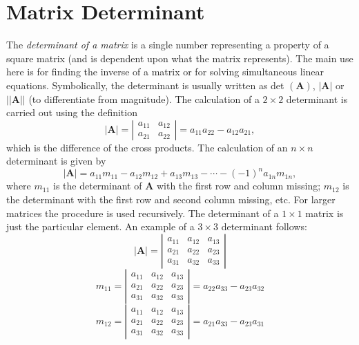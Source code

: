\section{Matrix Determinant}
The \emph{determinant of a matrix} is a single number representing a property of a square matrix 
(and is dependent upon what the matrix represents). The main use here is for finding the inverse of a 
matrix or for solving simultaneous linear equations. Symbolically, the determinant is usually written as
det $(\mathbf{A})$, $\mathbf{|A|}$ or $\mathbf{||A||}$ (to differentiate from magnitude).
The calculation of a $2 \times 2$ determinant is carried out using the definition
\begin{equation}
|\mathbf{A}| = \left| \begin{array}{cc} a_{11} & a_{12} \\
a_{21} & a_{22}
\end{array} \right| = a_{11}a_{22} - a_{12}a_{21},
\end{equation}	 
which is the difference of the cross products. The calculation of an $n \times n$ determinant is given by
\begin{equation}
|\mathbf{A}| = a_{11} m_{11} - a_{12} m_{12} + a_{13} m_{13} - \cdots - (-1)^na_{1n} m_{1n},
\end{equation}	 
where $m_{11}$ is the determinant of $\mathbf{A}$ with the first row and column missing; $m_{12}$ is the determinant with 
the first row and second column missing, etc. For larger matrices the procedure is used recursively.
The determinant of a $1 \times 1$ matrix is just the 
particular element. An example of a $3 \times 3$ determinant follows:
\begin{equation}
|\mathbf{A} | = \left | \begin{array}{ccc}
a_{11} & a_{12} & a_{13}\\
a_{21} & a_{22} & a_{23}\\
a_{31} & a_{32} & a_{33}
\end{array}\right |
\end{equation}
\begin{equation}
m_{11} = \left| \begin{array}{ccc}
a_{11} & a_{12} & a_{13}\\
a_{21} & a_{22} & a_{23}\\
a_{31} & a_{32} & a_{33}
\end{array} \right |
= a_{22}a_{33} - a_{23}a_{32}
\end{equation}
\begin{equation}
m_{12} = \left| \begin{array}{ccc}
a_{11} & a_{12} & a_{13}\\
a_{21} & a_{22} & a_{23}\\
a_{31} & a_{32} & a_{33}
\end{array} \right |
= a_{21}a_{33} - a_{23}a_{31}
\end{equation}

